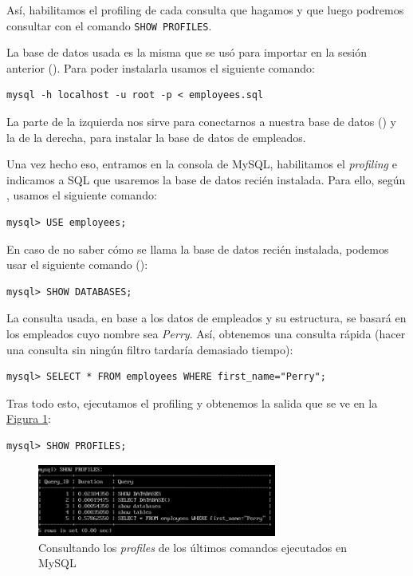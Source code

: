 \documentclass[10pt,a4paper,spanish]{article}
\numberwithin{equation}{section} %
\numberwithin{figure}{section} %
\numberwithin{table}{section} %
\begin{document}
Así, habilitamos el profiling de cada consulta que hagamos y que luego podremos consultar con el comando \texttt{SHOW PROFILES}.

La base de datos usada es la misma que se usó para importar en la sesión anterior (\cite{testdb}). Para poder instalarla usamos el siguiente comando:
\begin{verbatim}
mysql -h localhost -u root -p < employees.sql
\end{verbatim}

La parte de la izquierda nos sirve para conectarnos a nuestra base de datos (\cite{logmysql}) y la de la derecha, para instalar la base de datos de empleados.

Una vez hecho eso, entramos en la consola de MySQL, habilitamos el \textit{profiling} e indicamos a SQL que usaremos la base de datos recién instalada. Para ello, según \cite{selectdb}, usamos el siguiente comando:
\begin{verbatim}
mysql> USE employees;
\end{verbatim}

En caso de no saber cómo se llama la base de datos recién instalada, podemos usar el siguiente comando (\cite{showdb}):
\begin{verbatim}
mysql> SHOW DATABASES;
\end{verbatim}

La consulta usada, en base a los datos de empleados y su estructura, se basará en los empleados cuyo nombre sea \textit{Perry}. Así, obtenemos una consulta rápida (hacer una consulta sin ningún filtro tardaría demasiado tiempo):
\begin{verbatim}
mysql> SELECT * FROM employees WHERE first_name="Perry";
\end{verbatim}

Tras todo esto, ejecutamos el profiling y obtenemos la salida que se ve en la \hyperref[profilesql]{Figura \ref*{profilesql}}:
\begin{verbatim}
mysql> SHOW PROFILES;
\end{verbatim}

\begin{figure}[!h]
    \centering
    \includegraphics[width=0.7\textwidth]{43}
    \caption{Consultando los \textit{profiles} de los últimos comandos ejecutados en MySQL}
    \label{profilesql}
\end{figure}
\end{document}
